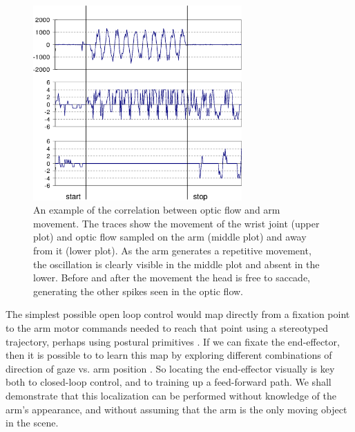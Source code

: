 \begin{figure}[tb]
\begin{center}
\includegraphics[width=8cm]{joint-correlation2.eps}
\caption{ 
\label{fig:joint-correlation}
%
An example of the correlation between optic flow and arm movement.
The traces show the movement of the wrist joint (upper plot)
and optic flow sampled on the arm (middle plot) and away from it (lower
plot).  As the arm generates a repetitive movement, the oscillation
is clearly visible in the middle plot and absent in the lower.
Before and after the movement the head is free to saccade, generating the
other spikes seen in the optic flow.
%
}
\end{center}
\end{figure}


The simplest possible open loop control would map directly from a
fixation point to the arm motor commands needed to reach that point
\cite{metta99developmental} using a stereotyped trajectory, perhaps
using postural primitives \cite{mussa-ivaldi92vector}.  If we can
fixate the end-effector, then it is possible to to learn this map by
exploring different combinations of direction of gaze vs.  arm
position \cite{Marjanovic-96-SAB,metta99developmental}.  So locating
the end-effector visually is key both to closed-loop control, and to
training up a feed-forward path.  We shall demonstrate that this
localization can be performed without knowledge of the arm's appearance,
and without assuming that the arm is the only moving object in the
scene.

